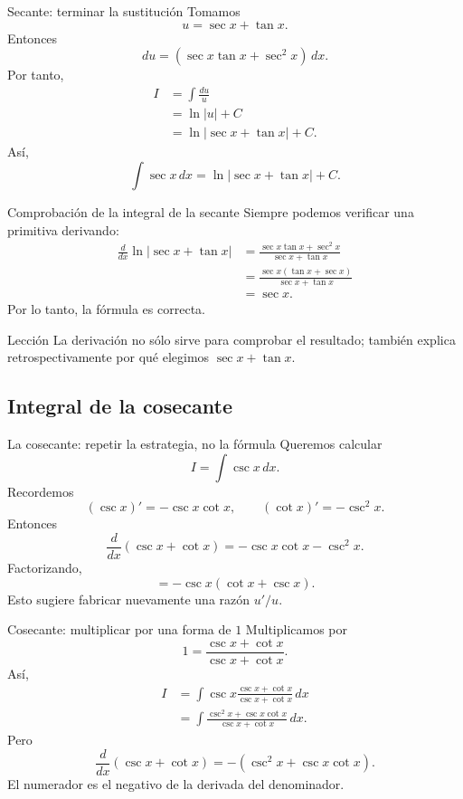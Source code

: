 \documentclass[10pt,aspectratio=169]{beamer}
\begin{document}
\begin{frame}{Secante: terminar la sustitución}
Tomamos
\[
\boxed{u=\sec x+\tan x}.
\]
Entonces
\[
du=(\sec x\tan x+\sec^2x)\,dx.
\]
Por tanto,
\begin{align*}
I
&=\int\frac{du}{u}\\
&=\ln|u|+C\\
&=\boxed{\ln|\sec x+\tan x|+C}.
\end{align*}
Así,
\[
\boxed{\int\sec x\,dx=\ln|\sec x+\tan x|+C.}
\]
\end{frame}

\begin{frame}{Comprobación de la integral de la secante}
Siempre podemos verificar una primitiva derivando:
\small
\begin{align*}
\frac{d}{dx}\ln|\sec x+\tan x|
&=\frac{\sec x\tan x+\sec^2x}{\sec x+\tan x}\\
&=\frac{\sec x(\tan x+\sec x)}{\sec x+\tan x}\\
&=\sec x.
\end{align*}
Por lo tanto, la fórmula es correcta.
\begin{block}{Lección}
La derivación no sólo sirve para comprobar el resultado; también explica retrospectivamente por qué elegimos $\sec x+\tan x$.
\end{block}
\end{frame}

\subsection{Integral de la cosecante}
\begin{frame}{La cosecante: repetir la estrategia, no la fórmula}
Queremos calcular
\[
I=\int\csc x\,dx.
\]
Recordemos
\[
(\csc x)'=-\csc x\cot x,
\qquad
(\cot x)'=-\csc^2x.
\]
Entonces
\[
\frac{d}{dx}(\csc x+\cot x)
=-\csc x\cot x-\csc^2x.
\]
Factorizando,
\[
=-\csc x(\cot x+\csc x).
\]
Esto sugiere fabricar nuevamente una razón $u'/u$.
\end{frame}

\begin{frame}{Cosecante: multiplicar por una forma de $1$}
Multiplicamos por
\[
1=\frac{\csc x+\cot x}{\csc x+\cot x}.
\]
Así,
\begin{align*}
I
&=\int\csc x
\frac{\csc x+\cot x}{\csc x+\cot x}\,dx\\[1mm]
&=\int
\frac{\csc^2x+\csc x\cot x}{\csc x+\cot x}\,dx.
\end{align*}
Pero
\[
\frac{d}{dx}(\csc x+\cot x)
=-(\csc^2x+\csc x\cot x).
\]
El numerador es el negativo de la derivada del denominador.
\end{frame}
\end{document}
